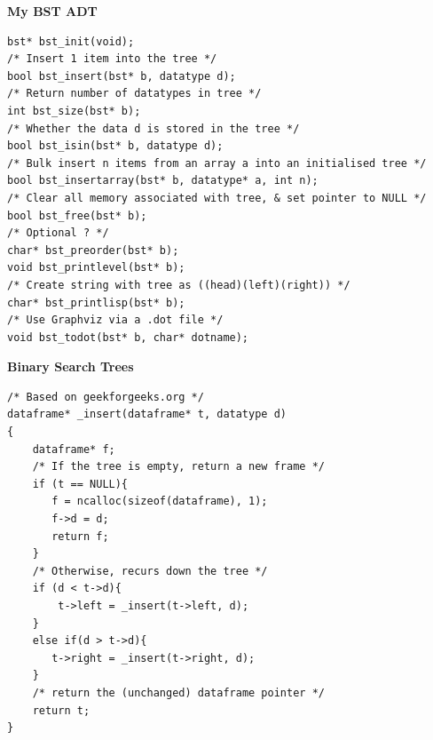 \newpage	
{\samepage	
\begin{center}	
{\Large{\bf My BST ADT}}	
\end{center}	
{\small	
\begin{verbatim}	
bst* bst_init(void);	
/* Insert 1 item into the tree */	
bool bst_insert(bst* b, datatype d);	
/* Return number of datatypes in tree */	
int bst_size(bst* b);	
/* Whether the data d is stored in the tree */	
bool bst_isin(bst* b, datatype d);	
/* Bulk insert n items from an array a into an initialised tree */	
bool bst_insertarray(bst* b, datatype* a, int n);	
/* Clear all memory associated with tree, & set pointer to NULL */	
bool bst_free(bst* b);	
/* Optional ? */	
char* bst_preorder(bst* b);	
void bst_printlevel(bst* b);	
/* Create string with tree as ((head)(left)(right)) */	
char* bst_printlisp(bst* b);	
/* Use Graphviz via a .dot file */	
void bst_todot(bst* b, char* dotname);	
\end{verbatim}	
}}	

\newpage	
{\samepage	
\begin{center}	
{\Large{\bf Binary Search Trees}}	
\end{center}	
\begin{verbatim}	
/* Based on geekforgeeks.org */	
dataframe* _insert(dataframe* t, datatype d)	
{	
    dataframe* f;	
    /* If the tree is empty, return a new frame */	
    if (t == NULL){	
       f = ncalloc(sizeof(dataframe), 1);	
       f->d = d;	
       return f;	
    }	
    /* Otherwise, recurs down the tree */	
    if (d < t->d){	
        t->left = _insert(t->left, d);	
    }	
    else if(d > t->d){	
       t->right = _insert(t->right, d);	
    }	
    /* return the (unchanged) dataframe pointer */	
    return t;	
}	
\end{verbatim}	
}	

